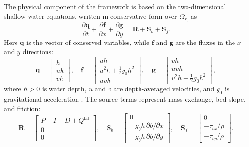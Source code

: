 \documentclass[pdflatex,sn-mathphys-ay]{sn-jnl}
\theoremstyle{thmstyleone}
\theoremstyle{thmstylethree}
\theoremstyle{thmstyletwo}
\begin{document}
The physical component of the framework is based on the two-dimensional
shallow-water equations, written in conservative form over
$\Omega_{r_i}$ as
\begin{equation}
  \frac{\partial \mathbf{q}}{\partial t}
  +
  \frac{\partial \mathbf{f}}{\partial x}
  +
  \frac{\partial \mathbf{g}}{\partial y}
  =
  \mathbf{R}
  +
  \mathbf{S}_{b}
  +
  \mathbf{S}_{f}.
  \label{eq:swe_main}
\end{equation}
Here $\mathbf{q}$ is the vector of conserved variables, while
$\mathbf{f}$ and $\mathbf{g}$ are the fluxes in the $x$ and $y$
directions:
\begin{equation}
  \mathbf{q}
  =
  \begin{bmatrix}
    h \\ uh \\ vh
  \end{bmatrix},
  \quad
  \mathbf{f}
  =
  \begin{bmatrix}
    uh \\
    u^{2}h+\tfrac{1}{2}g_{0}h^{2} \\
    uvh
  \end{bmatrix},
  \quad
  \mathbf{g}
  =
  \begin{bmatrix}
    vh \\
    uvh \\
    v^{2}h+\tfrac{1}{2}g_{0}h^{2}
  \end{bmatrix},
  \label{eq:swe_fluxes}
\end{equation}
where $h>0$ is water depth, $u$ and $v$ are depth-averaged velocities,
and $g_{0}$ is gravitational acceleration \citep{Bates2010,Liang2010}.
The source terms represent mass exchange, bed slope, and friction:
\begin{equation}
  \mathbf{R}
  =
  \begin{bmatrix}
    P-I-D+Q^{\mathrm{lat}} \\ 0 \\ 0
  \end{bmatrix},
  \quad
  \mathbf{S}_{b}
  =
  \begin{bmatrix}
    0 \\
    -g_{0}h\,\partial b/\partial x \\
    -g_{0}h\,\partial b/\partial y
  \end{bmatrix},
  \quad
  \mathbf{S}_{f}
  =
  \begin{bmatrix}
    0 \\
    -\tau_{bx}/\rho \\
    -\tau_{by}/\rho
  \end{bmatrix}.
  \label{eq:swe_sources}
\end{equation}
\end{document}
